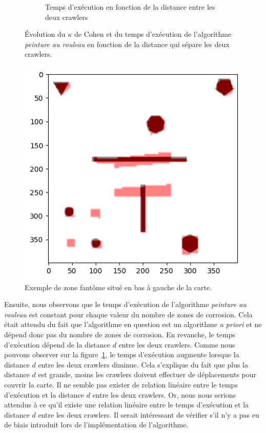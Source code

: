 \documentclass[english,RandD]{rapportPFE}  %
\begin{document}
\begin{figure}[h!]
\begin{subfigure}[t]{0.49\linewidth}
						\caption{Temps d'exécution en fonction de la distance entre les deux crawlers}
						\label{fig:peinture_au_rouleau-time_vs_distance}
				\end{subfigure}
				\caption{Évolution du $\kappa$ de Cohen et du temps d'exécution de l'algorithme \textit{peinture au rouleau} en fonction de la distance qui sépare les deux crawlers.}
				\label{fig:peinture_au_rouleau-distance}
			\end{figure}

			\begin{figure}[h!]
				\centering
				\includegraphics[width=0.5\linewidth]{graphics/output.png}
				\caption{Exemple de zone fantôme situé en bas à gauche de la carte.}
				\label{fig:ghost_zone}
			\end{figure}

			Ensuite, nous observons que le temps d'exécution de l'algorithme \textit{peinture au rouleau} est constant pour chaque valeur du nombre de zones de corrosion.
			Cela était attendu du fait que l'algorithme en question est un algorithme \textit{a priori} et ne dépend donc pas du nombre de zones de corrosion.
			En revanche, le temps d'exécution dépend de la distance $d$ entre les deux crawlers.
			Comme nous pouvons observer sur la figure~\ref{fig:peinture_au_rouleau-time_vs_distance}, le temps d'exécution augmente lorsque la distance $d$ entre les deux crawlers diminue.
			Cela s'explique du fait que plus la distance $d$ est grande, moins les crawlers doivent effectuer de déplacements pour couvrir la carte.
			Il ne semble pas exister de relation linéaire entre le temps d'exécution et la distance $d$ entre les deux crawlers.
			Or, nous nous serions attendus à ce qu'il existe une relation linéaire entre le temps d'exécution et la distance $d$ entre les deux crawlers.
			Il serait intéressant de vérifier s'il n'y a pas eu de biais introduit lors de l'implémentation de l'algorithme.
\end{document}
